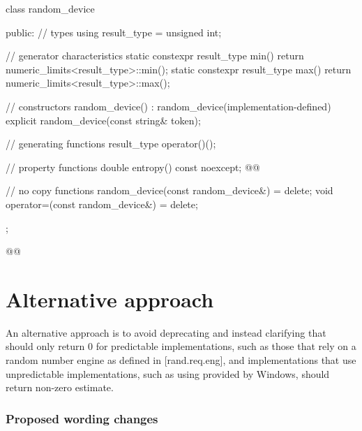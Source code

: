 \documentclass{wg21}
\begin{document}
\begin{codeblock}
    class random_device {
        public:
        // types
        using result_type = unsigned int;

        // generator characteristics
        static constexpr result_type min() { return numeric_limits<result_type>::min(); }
        static constexpr result_type max() { return numeric_limits<result_type>::max(); }

        // constructors
        random_device() : random_device(implementation-defined) {}
        explicit random_device(const string& token);

        // generating functions
        result_type operator()();

        // property functions
        double entropy() const noexcept;
        @@

        // no copy functions
        random_device(const random_device&) = delete;
        void operator=(const random_device&) = delete;
    };
\end{codeblock}

\begin{codeblock}
@@
\end{codeblock}

\begin{itemdescr}
\end{itemdescr}



\hypertarget{alternative-approach}{%
    \section{Alternative approach}\label{alternative-approach}}

An alternative approach is to avoid deprecating 
and instead clarifying that  should only
return 0 for predictable implementations, such as those that rely on a
random number engine as defined in [rand.req.eng], and implementations
that use unpredictable implementations, such as using 
provided by Windows, should return non-zero estimate.



\hypertarget{entropy-query-wording}{%
    \subsubsection{Proposed wording changes}\label{entropy-query-wording}}
\end{document}

